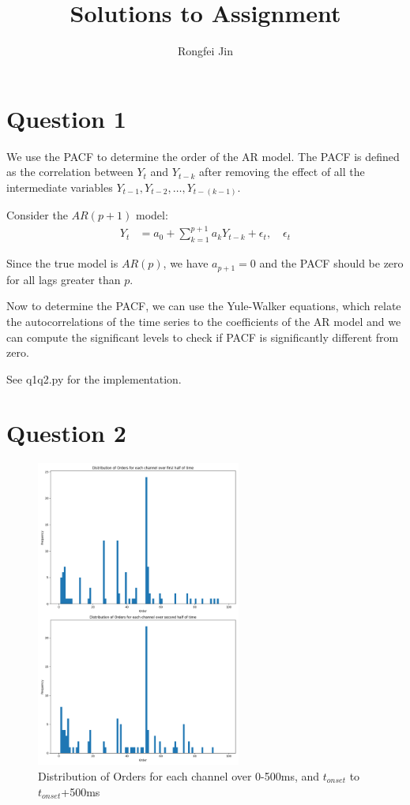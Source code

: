 \documentclass{article}
\title{Solutions to Assignment }
\author{Rongfei Jin}
\begin{document}
\pagestyle{fancy}
\fancyhf{}%
\fancyfoot[C]{\thepage}%
\maketitle

\section*{Question 1}

We use the PACF to determine the order of the AR model. The PACF is defined as the correlation between $Y_t$ and $Y_{t-k}$ after removing the effect of all the intermediate variables $Y_{t-1}, Y_{t-2}, \ldots, Y_{t-(k-1)}$.

Consider the \(AR(p+1)\) model:
\begin{align*} 
Y_t &= a_0 + \sum_{k=1}^{p+1} a_k Y_{t-k} + \epsilon_t, \quad \epsilon_t
\end{align*}

Since the true model is \(AR(p)\), we have \(a_{p+1} = 0\) and the PACF should be zero for all lags greater than \(p\).

Now to determine the PACF, we can use the Yule-Walker equations, which relate the autocorrelations of the time series to the coefficients of the AR model and we can compute the significant levels to check if PACF is significantly different from zero.

See q1q2.py for the implementation.
\newpage
\section*{Question 2}

\begin{figure}[h!]
    \centering
    \includegraphics[width=0.6\textwidth]{figs/q2.png}
    \caption{Distribution of Orders for each channel over  0-500ms, and  \(t_{onset}\) to \(t_{onset}\)+500ms}
    \label{fig:q2}
\end{figure}
\end{document}

